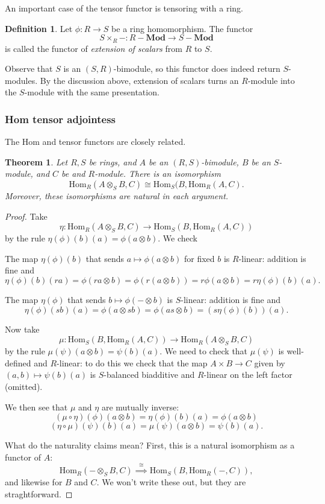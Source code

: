 \documentclass{amsart}[12pt]
\newcommand{\Hom}{\mathrm{Hom}}
\newcommand{\DEF}[1]{\emph{#1}\index{#1}}
\numberwithin{equation}{section}
\theoremstyle{plain} %
\newtheorem{thm}[equation]{Theorem}
\theoremstyle{definition}
\newtheorem{defn}[equation]{Definition}
\theoremstyle{remark}
\newcommand{\sssec}[1]{\subsubsection{#1}}
\newcommand{\Mod}[1]{#1-\mathbf{Mod}}
\begin{document}
An important case of the tensor functor is tensoring with a ring.

\begin{defn}
Let $\phi: R \to S$ be a ring homomorphism. The functor
\[ S \times_R - : \Mod{R} \to \Mod{S}\]
is called the functor of \DEF{extension of scalars} from $R$ to $S$.
\end{defn}

Observe that $S$ is an $(S,R)$-bimodule, so this functor does indeed return $S$-modules. By the discussion above, extension of scalars turns an $R$-module into the $S$-module with the same presentation.


\sssec{Hom tensor adjointess}

The Hom and tensor functors are closely related.

\begin{thm} Let $R,S$ be rings, and $A$ be an $(R,S)$-bimodule, $B$ be an $S$-module, and $C$ be and $R$-module. There is an isomorphism
\[ \Hom_R(A\otimes_S B, C) \cong \Hom_S(B,\Hom_R(A,C).\]
Moreover, these isomorphisms are natural in each argument.
\end{thm}
\begin{proof}
Take 
\[\eta:\Hom_R(A\otimes_S B, C) \to \Hom_S(B,\Hom_R(A,C)) \]
by the rule $\eta(\phi)(b)(a) = \phi(a\otimes b)$. We check

The map $\eta(\phi)(b)$ that sends $a\mapsto \phi(a\otimes b)$ for fixed $b$ is $R$-linear: addition is fine and \[\eta(\phi)(b)(ra)=\phi(ra \otimes b) = \phi(r(a\otimes b))=r\phi(a \otimes b) = r \eta(\phi)(b)(a). \]

The map $\eta(\phi)$ that sends $b \mapsto \phi(-\otimes b)$ is $S$-linear: addition is fine and
\[ \eta(\phi)(sb)(a)= \phi(a \otimes sb) = \phi(as \otimes b) = (s\eta(\phi)(b))(a).\]

Now take
\[ \mu: \Hom_S(B,\Hom_R(A,C)) \to \Hom_R(A\otimes_S B, C) \]
by the rule $\mu(\psi)(a\otimes b) = \psi(b)(a)$.
We need to check that $\mu(\psi)$ is well-defined and $R$-linear: to do this we check that the map $A\times B \to C$ given by $(a,b)\mapsto \psi(b)(a)$ is $S$-balanced biadditive and $R$-linear on the left factor (omitted). 

We then see that $\mu$ and $\eta$ are mutually inverse: 
\[(\mu\circ\eta)(\phi)(a\otimes b) = \eta(\phi)(b)(a) = \phi(a\otimes b)\]
\[ (\eta\circ \mu)(\psi)(b)(a) = \mu(\psi)(a\otimes b) = \psi(b)(a).\]

What do the naturality claims mean? First, this is a natural isomorphism as a functor of $A$:
\[ \Hom_R( - \otimes_S B, C) \stackrel{\cong}{\implies} \Hom_S( B,\Hom_R(-,C)),\]
and likewise for $B$ and $C$. We won't write these out, but they are straghtforward.
\end{proof}
\end{document}
